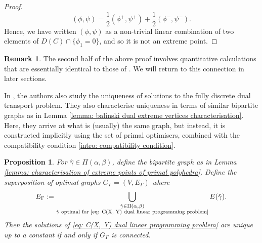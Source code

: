 \documentclass[11pt, oneside, titlepage]{book}
\theoremstyle{plain}
\newtheorem{proposition}[theorem]{Proposition}
\theoremstyle{definition}
\newtheorem{remark}[theorem]{Remark}
\begin{document}
\begin{proof}
\begin{equation*}
    (\phi, \psi) = \frac{1}{2} (\phi^+, \psi^+) + \frac{1}{2}(\phi^-, \psi^-).
\end{equation*}
Hence, we have written $(\phi, \psi)$ as a non-trivial linear combination of two elements of $D(C)\cap\{\phi_1=0\}$, and so it is not an extreme point.
\end{proof}

\begin{remark}
    The second half of the above proof involves quantitative calculations that are essentially identical to those of \cite[Theorem 3.9]{acciaio2025characterization}. We will return to this connection in later sections.
\end{remark}


In \cite{acciaio2025characterization}, the authors also study the uniqueness of solutions to the fully discrete dual transport problem. They also characterise uniqueness in terms of similar bipartite graphs as in Lemma \ref{lemma: balinski dual extreme vertices characterisation}. Here, they arrive at what is (usually) the same graph, but instead, it is constructed implicitly using the set of primal optimisers, combined with the compatibility condition \eqref{intro: compatibility condition}.
\begin{proposition} \textnormal{\cite[Proposition 3.5 (ii)/Corollary 3.14]{acciaio2025characterization}}
\label{prop: acciaio discrete dual uniqueness}
    For $\hat\gamma \in \Pi(\alpha, \beta)$, define the bipartite graph as in Lemma \ref{lemma: characterisation of extreme points of primal polyhedra}. Define the superposition of optimal graphs $G_\Gamma = (V, E_\Gamma)$ where
    \begin{equation*}
        E_\Gamma : = \bigcup_{\substack{\hat\gamma \in \Pi(\alpha, \beta)\\ \hat\gamma \text{ optimal for \eqref{eq: C(X, Y) dual linear programming problem}}}} E(\hat\gamma).
    \end{equation*}
    Then the solutions of \eqref{eq: C(X, Y) dual linear programming problem} are unique up to a constant if and only if $G_\Gamma$ is connected.
\end{proposition}
\end{document}
